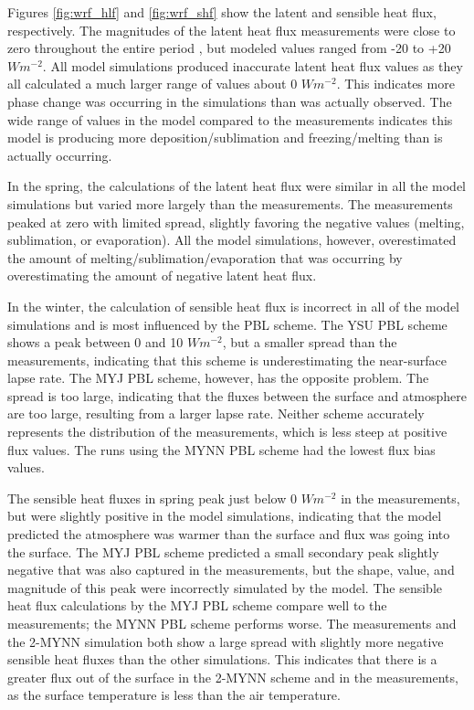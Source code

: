 Figures \ref{fig:wrf_hlf} and \ref{fig:wrf_shf} show the latent and sensible heat flux, respectively. The magnitudes of the latent heat flux measurements were close to zero throughout the entire period \citep{walden:2017}, but modeled values ranged from -20 to +20 $Wm^{-2}$. All model simulations produced inaccurate latent heat flux values as they all calculated a much larger range of values about 0 $Wm^{-2}$. This indicates more phase change was occurring in the simulations than was actually observed. The wide range of values in the model compared to the measurements indicates this model is producing more deposition/sublimation and freezing/melting than is actually occurring. 

In the spring, the calculations of the latent heat flux were similar in all the model simulations but varied more largely than the measurements. The measurements peaked at zero with limited spread, slightly favoring the negative values (melting, sublimation, or evaporation). All the model simulations, however, overestimated the amount of melting/sublimation/evaporation that was occurring by overestimating the amount of negative latent heat flux. 

In the winter, the calculation of sensible heat flux is incorrect in all of the model simulations and is most influenced by the PBL scheme. The YSU PBL scheme shows a peak between 0 and 10 $Wm^{-2}$, but a smaller spread than the measurements, indicating that this scheme is underestimating the near-surface lapse rate. The MYJ PBL scheme, however, has the opposite problem. The spread is too large, indicating that the fluxes between the surface and atmosphere are too large, resulting from a larger lapse rate. Neither scheme accurately represents the distribution of the measurements, which is less steep at positive flux values. The runs using the MYNN PBL scheme had the lowest flux bias values.

The sensible heat fluxes in spring peak just below 0 $Wm^{-2}$ in the measurements, but were slightly positive in the model simulations, indicating that the model predicted the atmosphere was warmer than the surface and flux was going into the surface. The MYJ PBL scheme predicted a small secondary peak slightly negative that was also captured in the measurements, but the shape, value, and magnitude of this peak were incorrectly simulated by the model. The sensible heat flux calculations by the MYJ PBL scheme compare well to the measurements; the MYNN PBL scheme performs worse. The measurements and the 2-MYNN simulation both show a large spread with slightly more negative sensible heat fluxes than the other simulations. This indicates that there is a greater flux out of the surface in the 2-MYNN scheme and in the measurements, as the surface temperature is less than the air temperature.

